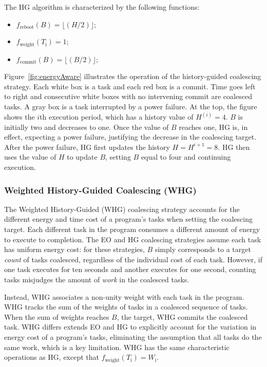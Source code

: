 The HG algorithm is characterized by the following functions: 

\begin{itemize}
\item $f_\text{reboot}(B) = \lfloor(H / 2)\rfloor;$
\item $f_\text{weight}(T_\text{i}) =  1$; 
\item $f_\text{commit}(B) = \lfloor(B / 2)\rfloor;$ 
\end{itemize}

Figure~\ref{fig:energyAware} illustrates the operation of the history-guided
coalescing strategy.  Each white box is a task and each red box is a commit.
Time goes left to right and consecutive white boxes with no intervening commit
are coalesced tasks.  A gray box is a task interrupted by a power failure.  At
the top, the figure shows the $i$th execution period, which has a history
value of $H^{(i)} = 4$.  $B$ is initially two and decreases to one.  Once the
value of $B$ reaches one, HG is, in effect, expecting a power failure,
justifying the decrease in the coalescing target.  After the power failure, HG
first updates the history $H = H^{i+1} = 8$. HG then uses the value of $H$ to
update $B$, setting $B$ equal to four and continuing execution.  


\subsubsection{Weighted History-Guided Coalescing (WHG)}
\label{subsec:energyTaskAware}

The Weighted History-Guided (WHG) coalescing strategy accounts for the
different energy and time cost of a program's tasks when setting the coalescing
target.
%
Each different task in the program consumes a different amount of energy to
execute to completion.  
%
The EO and HG coalescing strategies assume each task has uniform energy cost:
for these strategies, $B$ simply corresponds to a target {\em count} of tasks
coalesced, regardless of the individual cost of each task.
%
However, if one task executes for ten seconds and another executes for one
second, counting tasks misjudges the amount of {\em work} in the coalesced
tasks.

Instead, WHG associates a non-unity weight with each task in the program. 
%
WHG tracks the sum of the weights of tasks in a coalesced sequence of tasks.
%
When the sum of weights reaches $B$, the target, WHG commits the coalesced
task.
%
WHG differs extends EO and HG to explicitly account for the variation in energy
cost of a program's tasks, eliminating the assumption that all tasks do the
same work, which is a key limitation.
%
WHG has the same characteristic operations as HG, except that
$f_\text{weight}(T_\text{i}) = W_\text{i}$.

